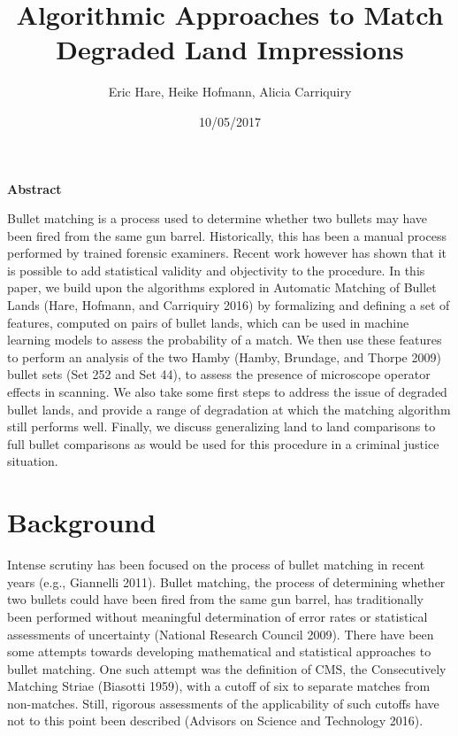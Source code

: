 \documentclass[12pt,]{article}
\title{Algorithmic Approaches to Match Degraded Land Impressions}
\author{Eric Hare, Heike Hofmann, Alicia Carriquiry}
\date{10/05/2017}
\theoremstyle{definition}
\theoremstyle{definition}
\theoremstyle{definition}
\theoremstyle{remark}
\begin{document}
\maketitle

\textbf{Abstract}

Bullet matching is a process used to determine whether two bullets may
have been fired from the same gun barrel. Historically, this has been a
manual process performed by trained forensic examiners. Recent work
however has shown that it is possible to add statistical validity and
objectivity to the procedure. In this paper, we build upon the
algorithms explored in Automatic Matching of Bullet Lands (Hare,
Hofmann, and Carriquiry 2016) by formalizing and defining a set of
features, computed on pairs of bullet lands, which can be used in
machine learning models to assess the probability of a match. We then
use these features to perform an analysis of the two Hamby (Hamby,
Brundage, and Thorpe 2009) bullet sets (Set 252 and Set 44), to assess
the presence of microscope operator effects in scanning. We also take
some first steps to address the issue of degraded bullet lands, and
provide a range of degradation at which the matching algorithm still
performs well. Finally, we discuss generalizing land to land comparisons
to full bullet comparisons as would be used for this procedure in a
criminal justice situation.

\section{Background}\label{background}

Intense scrutiny has been focused on the process of bullet matching in
recent years (e.g., Giannelli 2011). Bullet matching, the process of
determining whether two bullets could have been fired from the same gun
barrel, has traditionally been performed without meaningful
determination of error rates or statistical assessments of uncertainty
(National Research Council 2009). There have been some attempts towards
developing mathematical and statistical approaches to bullet matching.
One such attempt was the definition of CMS, the Consecutively Matching
Striae (Biasotti 1959), with a cutoff of six to separate matches from
non-matches. Still, rigorous assessments of the applicability of such
cutoffs have not to this point been described (Advisors on Science and
Technology 2016).
\end{document}
